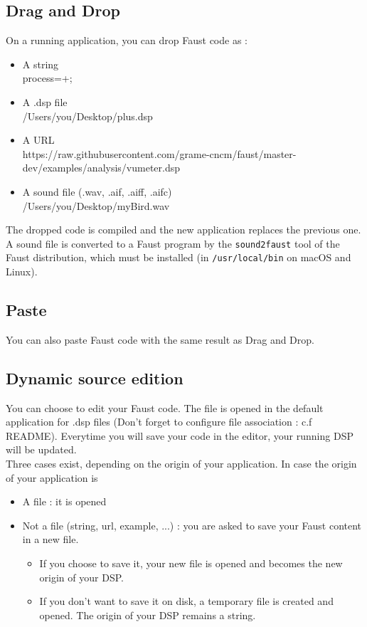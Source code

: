\documentclass[a4paper]{article}
\begin{document}
\subsection{Drag and Drop}
On a running application, you can drop Faust code as :
\begin{itemize}
\item A string \\process=+;
\item A .dsp file \\/Users/you/Desktop/plus.dsp
\item A URL \\https://raw.githubusercontent.com/grame-cncm/faust/master-dev/examples/analysis/vumeter.dsp
\item A sound file (.wav, .aif, .aiff, .aifc) \\/Users/you/Desktop/myBird.wav
\end{itemize}
The dropped code is compiled and the new application replaces the previous one. A sound file is converted to a Faust program by the \texttt{sound2faust} tool of the Faust distribution, which must be installed (in \texttt{/usr/local/bin} on macOS and Linux).

\subsection{Paste} 
You can also paste Faust code with the same result as Drag and Drop.

\subsection{Dynamic source edition}
You can choose to edit your Faust code. The file is opened in the default application for .dsp files (Don't forget to configure file association : c.f README). Everytime you will save your code in the editor, your running DSP will be updated. \\

Three cases exist, depending on the origin of your application. In case the origin of your application is
	\begin{itemize}
		\item A file :  it is opened
		\item Not a file (string, url, example, ...) : you are asked to save your Faust content in a new file.
		\begin{itemize}
		\item If you choose to save it, your new file is opened and becomes the new origin of your DSP.
		\item If you don't want to save it on disk, a temporary file is created and opened. The origin of your DSP remains a string.
	\end{itemize}

	\end{itemize}
\end{document}
